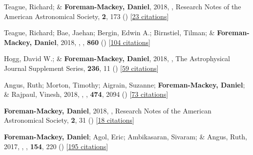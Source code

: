\item[{\color{numcolor}\scriptsize36}] Teague, Richard; \& \textbf{Foreman-Mackey, Daniel}, 2018, , Research Notes of the American Astronomical Society, \textbf{2}, 173 () [\href{https://ui.adsabs.harvard.edu/abs/2018RNAAS...2..173T}{23 citations}]

\item[{\color{numcolor}\scriptsize35}] Teague, Richard; Bae, Jaehan; Bergin, Edwin A.; Birnstiel, Tilman; \& \textbf{Foreman-Mackey, Daniel}, 2018, , \apj, \textbf{860} () [\href{https://ui.adsabs.harvard.edu/abs/2018ApJ...860L..12T}{104 citations}]

\item[{\color{numcolor}\scriptsize34}] Hogg, David W.; \& \textbf{Foreman-Mackey, Daniel}, 2018, , The Astrophysical Journal Supplement Series, \textbf{236}, 11 () [\href{https://ui.adsabs.harvard.edu/abs/2018ApJS..236...11H}{59 citations}]

\item[{\color{numcolor}\scriptsize33}] Angus, Ruth; Morton, Timothy; Aigrain, Suzanne; \textbf{Foreman-Mackey, Daniel}; \& Rajpaul, Vinesh, 2018, , \mnras, \textbf{474}, 2094 () [\href{https://ui.adsabs.harvard.edu/abs/2018MNRAS.474.2094A}{73 citations}]

\item[{\color{numcolor}\scriptsize32}] \textbf{Foreman-Mackey, Daniel}, 2018, , Research Notes of the American Astronomical Society, \textbf{2}, 31 () [\href{https://ui.adsabs.harvard.edu/abs/2018RNAAS...2...31F}{18 citations}]

\item[{\color{numcolor}\scriptsize31}] \textbf{Foreman-Mackey, Daniel}; Agol, Eric; Ambikasaran, Sivaram; \& Angus, Ruth, 2017, , \aj, \textbf{154}, 220 () [\href{https://ui.adsabs.harvard.edu/abs/2017AJ....154..220F}{195 citations}]

